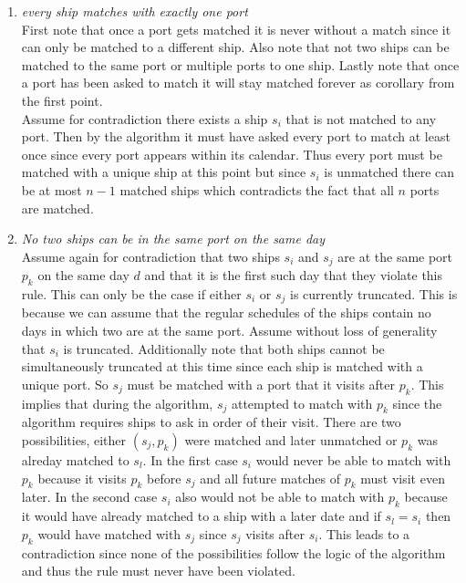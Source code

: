 \documentclass{amsart}
\begin{document}
\begin{enumerate}
\item \emph{every ship matches with exactly one port}\\
    First note that once a port gets matched it is never without a match since it can only
    be matched to a different ship. Also note that not two ships can be matched to the same port or multiple ports to one ship. Lastly
    note that once a port has been asked to match it will stay matched forever as corollary from the first point.\\
    Assume for contradiction there exists a ship $s_i$ that is not matched to any port. Then by the algorithm it must have asked every
    port to match at least once since every port appears within its calendar. Thus every port must be matched with a unique ship at this point but since
    $s_i$ is unmatched there can be at most $n-1$ matched ships which contradicts the fact that all $n$ ports are matched.
\item \emph{No two ships can be in the same port on the same day}\\
    Assume again for contradiction that two ships $s_i$ and $s_j$ are at the same port $p_k$ on the same day  $d$ and that it is the first such day that they violate this rule.
    This can only be the case if either $s_i$ or $s_j$ is currently truncated. This is because we can assume
    that the regular schedules of the ships contain no days in which two are at the same port.
    Assume without loss of generality that $s_i$ is truncated. Additionally note that both ships cannot be simultaneously truncated
    at this time since each ship is matched with a unique port. So $s_j$ must be matched with a port that it visits after $p_k$.
    This implies that during the algorithm, $s_j$ attempted to match with $p_k$ since the algorithm requires ships to ask in order of their visit.
    There are two possibilities, either  $(s_j,p_k)$ were matched and later unmatched or $p_k$ was alreday matched to $s_l$.
    In the first case $s_i$ would never be able to match with $p_k$ because it visits $p_k$ before $s_j$ and all future matches of $p_k$ must visit even later.
    In the second case $s_i$ also would not be able to match with $p_k$ because it would have already matched to a ship with a later date and if $s_l = s_i$ then $p_k$ would
    have matched with $s_j$ since $s_j$ visits after $s_i$. This leads to a contradiction since none of the possibilities follow the logic of the algorithm and thus the rule must
    never have been violated.

\end{enumerate}
\end{document}
